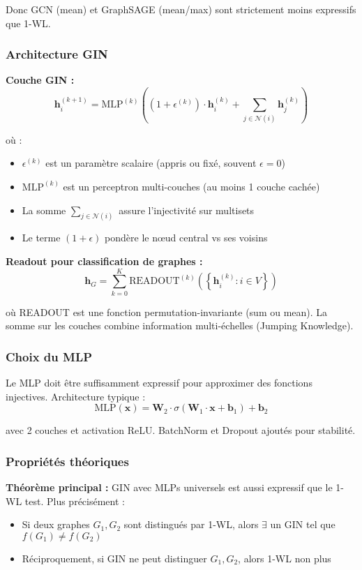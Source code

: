 Donc GCN (mean) et GraphSAGE (mean/max) sont strictement moins expressifs que 1-WL.

\subsubsection{Architecture GIN}

\textbf{Couche GIN :}
\[
\mathbf{h}_i^{(k+1)} = \text{MLP}^{(k)}\left(\left(1 + \epsilon^{(k)}\right) \cdot \mathbf{h}_i^{(k)} + \sum_{j \in \mathcal{N}(i)} \mathbf{h}_j^{(k)}\right)
\]

où :
\begin{itemize}
    \item $\epsilon^{(k)}$ est un paramètre scalaire (appris ou fixé, souvent $\epsilon = 0$)
    \item $\text{MLP}^{(k)}$ est un perceptron multi-couches (au moins 1 couche cachée)
    \item La somme $\sum_{j \in \mathcal{N}(i)}$ assure l'injectivité sur multisets
    \item Le terme $(1 + \epsilon)$ pondère le nœud central vs ses voisins
\end{itemize}

\textbf{Readout pour classification de graphes :}
\[
\mathbf{h}_G = \sum_{k=0}^K \text{READOUT}^{(k)}\left(\left\{\mathbf{h}_i^{(k)} : i \in V\right\}\right)
\]

où READOUT est une fonction permutation-invariante (sum ou mean). La somme sur les couches combine information multi-échelles (Jumping Knowledge).

\subsubsection{Choix du MLP}

Le MLP doit être suffisamment expressif pour approximer des fonctions injectives. Architecture typique :
\[
\text{MLP}(\mathbf{x}) = \mathbf{W}_2 \cdot \sigma(\mathbf{W}_1 \cdot \mathbf{x} + \mathbf{b}_1) + \mathbf{b}_2
\]

avec 2 couches et activation ReLU. BatchNorm et Dropout ajoutés pour stabilité.

\subsubsection{Propriétés théoriques}

\textbf{Théorème principal :}
GIN avec MLPs universels est aussi expressif que le 1-WL test. Plus précisément :
\begin{itemize}
    \item Si deux graphes $G_1, G_2$ sont distingués par 1-WL, alors $\exists$ un GIN tel que $f(G_1) \neq f(G_2)$
    \item Réciproquement, si GIN ne peut distinguer $G_1, G_2$, alors 1-WL non plus
\end{itemize}

